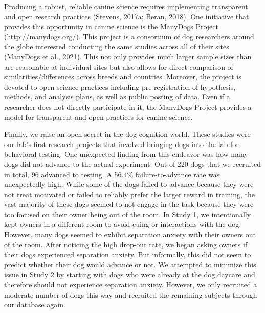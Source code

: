 \documentclass[
  pub,floatsintext]{apa6}
\begin{document}
Producing a robust, reliable canine science requires implementing transparent and open research practices (Stevens, 2017a; Beran, 2018). One initiative that provides this opportunity in canine science is the ManyDogs Project (\url{http://manydogs.org/}). This project is a consortium of dog researchers around the globe interested conducting the same studies across all of their sites (ManyDogs et al., 2021). This not only provides much larger sample sizes than are reasonable at individual sites but also allows for direct comparison of similarities/differences across breeds and countries. Moreover, the project is devoted to open science practices including pre-registration of hypothesis, methods, and analysis plans, as well as public posting of data. Even if a researcher does not directly participate in it, the ManyDogs Project provides a model for transparent and open practices for canine science.

Finally, we raise an open secret in the dog cognition world. These studies were our lab's first research projects that involved bringing dogs into the lab for behavioral testing. One unexpected finding from this endeavor was how many dogs did not advance to the actual experiment. Out of 220 dogs that we recruited in total, 96 advanced to testing. A 56.4\% failure-to-advance rate was unexpectedly high. While some of the dogs failed to advance because they were not treat motivated or failed to reliably prefer the larger reward in training, the vast majority of these dogs seemed to not engage in the task because they were too focused on their owner being out of the room. In Study 1, we intentionally kept owners in a different room to avoid cuing or interactions with the dog. However, many dogs seemed to exhibit separation anxiety with their owners out of the room. After noticing the high drop-out rate, we began asking owners if their dogs experienced separation anxiety. But informally, this did not seem to predict whether their dog would advance or not. We attempted to minimize this issue in Study 2 by starting with dogs who were already at the dog daycare and therefore should not experience separation anxiety. However, we only recruited a moderate number of dogs this way and recruited the remaining subjects through our database again.
\end{document}

